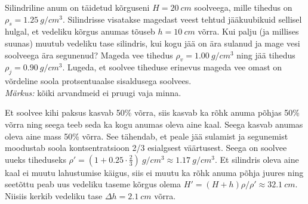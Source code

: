 
Silindriline anum on täidetud kõrguseni $H=\SI{20}{cm}$ soolveega, mille tihedus on $\rho_s=\SI{1.25}{g/cm^3}$. Silindrisse visatakse magedast veest tehtud jääkuubikuid sellisel hulgal, et vedeliku kõrgus anumas tõuseb $h=\SI{10}{cm}$ võrra. Kui palju (ja millises suunas) muutub vedeliku tase silindris, kui kogu jää on ära sulanud ja mage vesi soolveega ära segunenud? Mageda vee tihedus  $\rho_v=\SI{1.00}{g/cm^3}$ ning jää tihedus  $\rho_j=\SI{0.90}{g/cm^3}$. Lugeda, et soolvee tiheduse erinevus mageda vee omast on võrdeline soola protsentuaalse sisaldusega soolvees. \\
\emph{Märkus:} kõiki arvandmeid ei pruugi vaja minna.



\hint

\solu
Et soolvee kihi paksus kasvab 50\% võrra, siis kasvab ka rõhk anuma põhjas 50\% võrra ning seega teeb seda ka kogu anumas oleva aine kaal. Seega kasvab anumas oleva aine mass 50\% võrra. See tähendab, et peale jää sulamist ja segunemist moodustab soola kontsentratsioon 2/3 esialgsest väärtusest. Seega on soolvee uueks tiheduseks $\rho'=(1+0.25\cdot \frac 23)\SI{}{g/cm^3}\approx \SI{1.17}{g/cm^3}$. Et silindris oleva aine kaal ei muutu lahustumise käigus, siis ei muutu ka rõhk anuma põhja juures ning seetõttu peab uus vedeliku taseme kõrgus olema $H'=(H+h)\rho/\rho'\approx \SI{32.1}{cm}$. Niisiis kerkib vedeliku tase  $\Delta h=\SI{2.1}{cm}$ võrra.
\probend